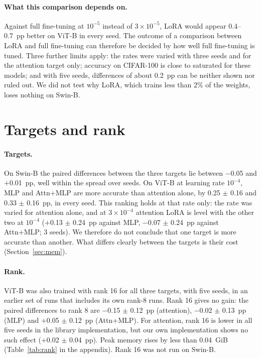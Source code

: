 \paragraph{What this comparison depends on.} Against full fine-tuning at $10^{-5}$ instead of $3\times10^{-5}$, LoRA
would appear 0.4--0.7~pp better on ViT-B in every seed. The outcome of a comparison between LoRA and full
fine-tuning can therefore be decided by how well full fine-tuning is tuned. Three further limits apply: the rates
were varied with three seeds and for the attention target only; accuracy on CIFAR-100 is close to saturated for
these models; and with five seeds, differences of about 0.2~pp can be neither shown nor ruled out. We did not test
why LoRA, which trains less than 2\% of the weights, loses nothing on Swin-B.

\section{Targets and rank}
\label{sec:targets}

\paragraph{Targets.} On Swin-B the paired differences between the three targets lie between $-$0.05 and
$+$0.01~pp, well within the spread over seeds. On ViT-B at learning rate $10^{-4}$, MLP and Attn+MLP are more accurate than attention
alone, by 0.25 $\pm$ 0.16 and 0.33 $\pm$ 0.16~pp, in every seed. This ranking holds at that rate only: the rate was
varied for attention alone, and at $3\times10^{-4}$ attention LoRA is level with the other two at $10^{-4}$
($+$0.13 $\pm$ 0.24~pp against MLP, $-$0.07 $\pm$ 0.24~pp against Attn+MLP; 3 seeds). We therefore do not conclude
that one target is more accurate than another. What differs clearly between the targets is their cost
(Section~\ref{sec:mem}).

\paragraph{Rank.}
\label{sec:rank}
ViT-B was also trained with rank 16 for all three targets, with five seeds, in an earlier set of runs that includes
its own rank-8 runs. Rank 16 gives no gain: the paired differences to rank 8 are $-$0.15 $\pm$ 0.12~pp (attention),
$-$0.02 $\pm$ 0.13~pp (MLP) and $+$0.05 $\pm$ 0.12~pp (Attn+MLP). For attention, rank 16 is lower in all five seeds
in the library implementation, but our own implementation shows no such effect ($+$0.02 $\pm$ 0.04~pp). Peak memory rises by less than 0.04~GiB
(Table~\ref{tab:rank} in the appendix). Rank 16 was not run on Swin-B.


